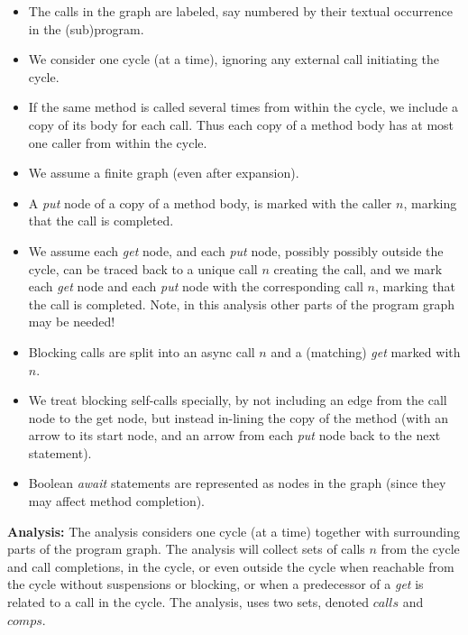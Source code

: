 \documentclass[12pt]{article}%
\begin{document}
\begin{itemize}
\item
The calls in the graph are labeled, 
say numbered by their textual occurrence in the (sub)program.
\item
 We consider one cycle (at a time),
ignoring any external call initiating the cycle.
\item
If the same method is called several times from within the cycle,
we include a copy of its body for each call.
Thus each copy of a  method body has  at most  one caller from within the cycle.
\item
We assume a finite graph (even after expansion).
\item 
A  \emph{put} node of a copy of a method body, is marked with the 
caller $n$, marking that the call is completed.
\item
We assume each \emph{get}  node,
and each \emph{put} node, possibly
possibly outside the cycle, 
can be traced back to a unique call $n$ creating the call,
and we mark each  \emph{get} node and each  \emph{put} node  with the corresponding call  $n$, marking that the call is 
completed.
Note, in this analysis other parts of the program graph may be needed!
\item
Blocking calls are split into an async call $n$ and a (matching) \emph{get}
marked with  $n$.
\item
We treat blocking self-calls specially,
by not including an edge from the call node to the get node,
but instead  in-lining  the copy of the method
 (with an arrow to its
start node, and an arrow from each  \emph{put} node
back to the next statement).
\item
Boolean \emph{await} statements are represented as nodes in the graph
(since they may affect method completion).

\end{itemize}
\textbf{Analysis:}
The analysis considers one cycle (at a time)
together with surrounding parts of the program graph.
The analysis will collect sets of calls $n$ from the cycle and call completions,
in  the cycle, or even outside  the cycle when  reachable from the cycle without suspensions or blocking,
or  when a predecessor of  a \emph{get} is related to a call in the cycle.
The analysis, uses two sets, denoted $calls$ and $comps$.
\end{document}
